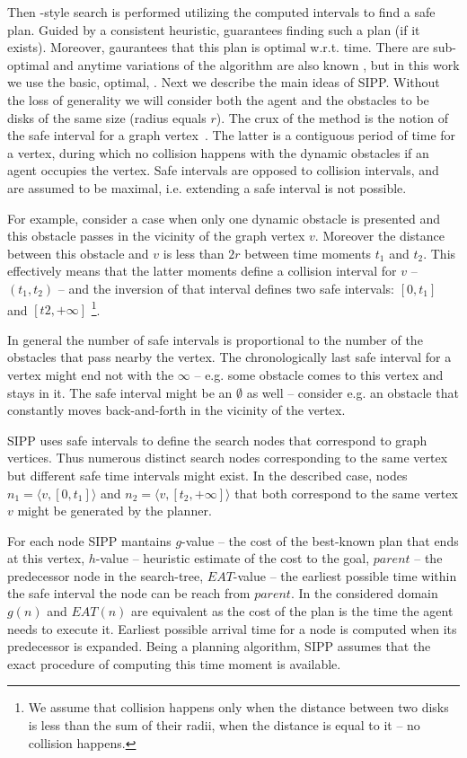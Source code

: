 Then \astar-style search is performed utilizing the computed intervals to find a safe plan. Guided by a consistent heuristic, \sipp guarantees finding such a plan (if it exists). Moreover, \sipp gaurantees that this plan is optimal w.r.t. time. 
There are sub-optimal and anytime variations of the algorithm are also known \cite{narayanan2012anytime,yakovlev2020revisiting}, but in this work we use the basic, optimal, \sipp. 
Next we describe the main ideas of SIPP. Without the loss of generality we will consider both the agent and the obstacles to be disks of the same size (radius equals $r$).
The crux of the method is the notion of the safe interval for a graph vertex~\cite{phillips2011sipp}. The latter  is a contiguous period of time for a vertex, during which no collision happens with the dynamic obstacles if an agent occupies the vertex. Safe intervals are opposed to collision intervals, and are assumed to be maximal, i.e. extending a safe interval is not possible.

For example, consider a case when only one dynamic obstacle is presented and this obstacle passes in the vicinity of the graph vertex $v$. Moreover the distance between this obstacle and $v$ is less than $2r$ between time moments $t_1$ and $t_2$. This effectively means that the latter moments define a collision interval for $v$ -- $(t_1, t_2)$ -- and the inversion of that interval defines two safe intervals: $[0, t_1]$ and $[t2, +\infty]$ \footnote{We assume that collision happens only when the distance between two disks is less than the sum of their radii, when the distance is equal to it -- no collision happens.}. \dor{Maybe it should be $[t2, +\infty)$}

In general the number of safe intervals is proportional to the number of the obstacles that pass nearby the vertex. The chronologically last safe interval for a vertex might end not with the $\infty$ -- e.g. some obstacle comes to this vertex and stays in it. The safe interval might be an $\emptyset$ as well -- consider e.g. an obstacle that constantly moves back-and-forth in the vicinity of the vertex.

SIPP uses safe intervals to define the search nodes that correspond to graph vertices. Thus numerous distinct search nodes corresponding to the same vertex but different safe time intervals might exist. In the described case, nodes $n_1=\langle v, [0, t_1] \rangle$ and $n_2=\langle v, [t_2, +\infty] \rangle$ that both correspond to the same vertex $v$ might be generated by the planner.

For each node SIPP mantains $g$-value -- the cost of the best-known plan that ends at this vertex, $h$-value -- heuristic estimate of the cost to the goal, $parent$ -- the predecessor node in the search-tree, $EAT$-value -- the earliest possible time within the safe interval the node can be reach from $parent$. In the considered domain $g(n)$ and $EAT(n)$ are equivalent as the cost of the plan is the time the agent needs to execute it. Earliest possible arrival time for a node is computed when its predecessor is expanded. Being a planning algorithm, SIPP assumes that the exact procedure of computing this time moment is available.

